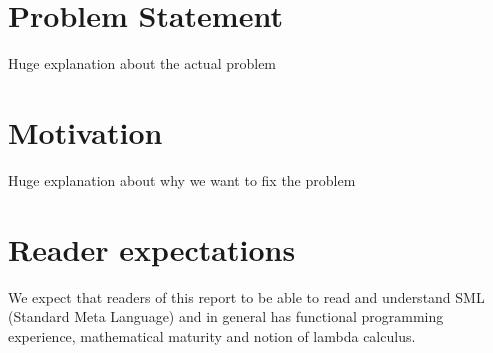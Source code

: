 
\section{Problem Statement}

Huge explanation about the actual problem

\section{Motivation}

Huge explanation about why we want to fix the problem

\section{Reader expectations}


We expect that readers of this report to be able to read and understand SML
(Standard Meta Language) and in general has functional programming experience,
mathematical maturity and notion of lambda calculus. 





